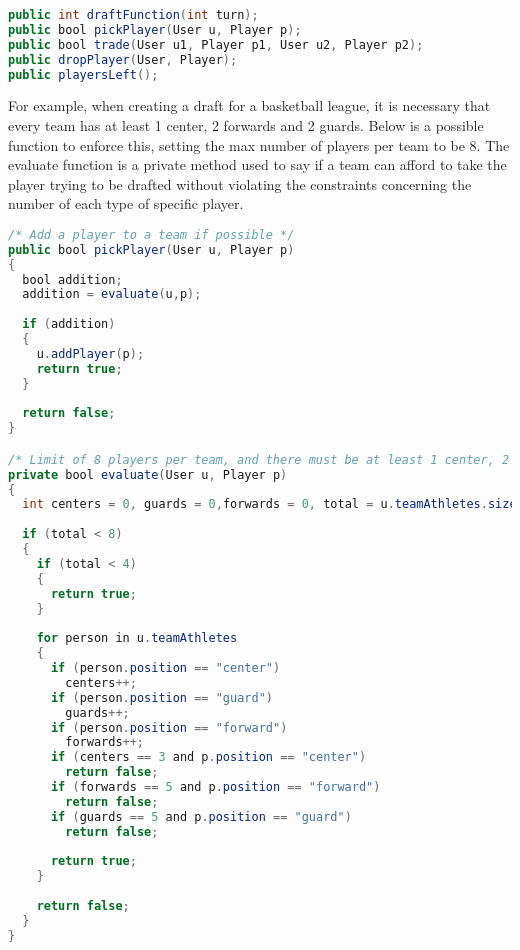 \documentclass[12pt]{report}
\begin{document}
\begin{singlespace}
\begin{lstlisting}[language=Java,label=some-code,caption=Draft methods]
public int draftFunction(int turn);
public bool pickPlayer(User u, Player p);
public bool trade(User u1, Player p1, User u2, Player p2);
public dropPlayer(User, Player);
public playersLeft();
\end{lstlisting}
\end{singlespace}

For example, when creating a draft for a basketball league, it is necessary that every team has at least 1 center, 2 forwards and 2 guards. Below is a possible function to enforce this, setting the max number of players per team to be 8. The evaluate function is a private method used to say if a team can afford to take the player trying to be drafted without violating the constraints concerning the number of each type of specific player.

\begin{singlespace}
\begin{lstlisting}[language=Java,label=some-code,caption=Picking a Player]
/* Add a player to a team if possible */
public bool pickPlayer(User u, Player p)
{
  bool addition;
  addition = evaluate(u,p);
  
  if (addition)
  {
    u.addPlayer(p);
    return true;
  }
  
  return false;
}

/* Limit of 8 players per team, and there must be at least 1 center, 2 guards and 2 forwards per team. */
private bool evaluate(User u, Player p)
{
  int centers = 0, guards = 0,forwards = 0, total = u.teamAthletes.size();
  
  if (total < 8)
  {
    if (total < 4)
    {
      return true;
    }
    
    for person in u.teamAthletes
    {
      if (person.position == "center")
        centers++;
      if (person.position == "guard")
        guards++;
      if (person.position == "forward")
        forwards++;
      if (centers == 3 and p.position == "center")
        return false;
      if (forwards == 5 and p.position == "forward")
        return false;
      if (guards == 5 and p.position == "guard")
        return false;
        
      return true;
    }
    
    return false;
  }
}
\end{lstlisting}
\end{singlespace}
\end{document}
